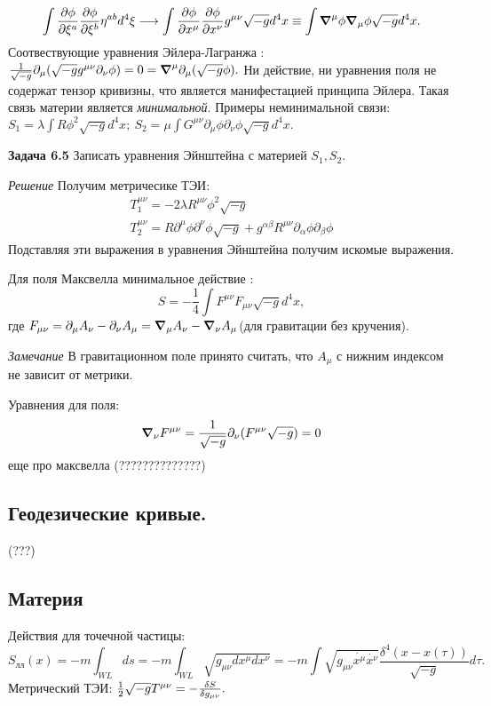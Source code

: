 \documentclass[a4paper]{article}
\begin{document}
\begin{equation}
\int \pdv{\phi}{\xi^a}\pdv{\phi}{\xi^b} \eta^{ab} d^4 \xi \longrightarrow \int \pdv{\phi}{x^\mu} \pdv{\phi}{x^\nu} g^{\mu \nu} \sqrt{-g} d^4 x \equiv \int \grad^\mu \phi \grad_\mu \phi \sqrt{-g} d^4 x.
\end{equation}
Соотвествующие уравнения Эйлера-Лагранжа :$ \frac{1}{\sqrt{-g}} \partial_\mu(\sqrt{-g} g^{\mu \nu} \partial_{\nu} \phi) = 0 = \grad^\mu \partial_\mu (\sqrt{-g} \phi).$
Ни действие, ни уравнения поля не содержат тензор кривизны, что является манифестацией принципа Эйлера. Такая связь материи является \textit{минимальной}. Примеры неминимальной связи: $ S_1 = \lambda \int R \phi^2 \sqrt{-g} d^4 x ; {~} S_2 = \mu \int G^{\mu \nu} \partial_\mu \phi \partial_\nu \phi \sqrt{-g} d^4 x.$ 
\par
\textbf{Задача 6.5} Записать уравнения Эйнштейна с материей $ S_1, S_2$.
\par 
\textit{Решение} Получим метричесике ТЭИ:
\begin{align}
T_1^{\mu \nu} = -2 \lambda R^{\mu \nu} \phi^2 \sqrt{-g} \\
T_2^{\mu \nu} = R \partial^\mu \phi \partial^\nu \phi \sqrt{-g} + g^{\alpha \beta} R^{\mu \nu} \partial_\alpha \phi \partial_\beta \phi
\end{align}
Подставляя эти выражения в уравнения Эйнштейна получим искомые выражения.
\par
Для поля Максвелла  минимальное действие :
\begin{equation}
S = -\frac{1}{4} \int F^{\mu \nu} F_{\mu \nu}  \sqrt{-g} d^4 x,
\end{equation}
где $F_{\mu \nu} = \partial_\mu A_\nu - \partial_\nu A_\mu = \grad_\mu A_\nu - \grad_\nu A_\mu$(для гравитации без кручения).
\par 
\textit{Замечание} В гравитационном поле принято считать, что $A_\mu$ с нижним индексом не зависит от метрики.
\par 
Уравнения для поля: 
\begin{equation}
\grad_\nu F^{\mu \nu} = \frac{1}{\sqrt{-g}} \partial_\nu (F^{\mu \nu} \sqrt{-g}) = 0
\end{equation}
еще про максвелла (??????????????)

\par 
\subsection{Геодезические кривые.}

(???)
\subsection{Материя}
Действия для точечной частицы:
\begin{equation}
S_{\text{лл}} (x) = -m \int_{WL} ds = - m \int_{WL} \sqrt{g_{\mu \nu} dx^\mu dx^\nu} = - m \int \sqrt{g_{\mu \nu} {\dot{x^\mu} \dot{x^\nu}}} \frac{\delta^4 ( x - x(\tau))}{\sqrt{-g}} d\tau.
\end{equation}
Метрический ТЭИ: $ \frac{1}{2} \sqrt{-g} T^{\mu \nu} = - \fdv{S}{g_{\mu \nu}}.$
\end{document}
